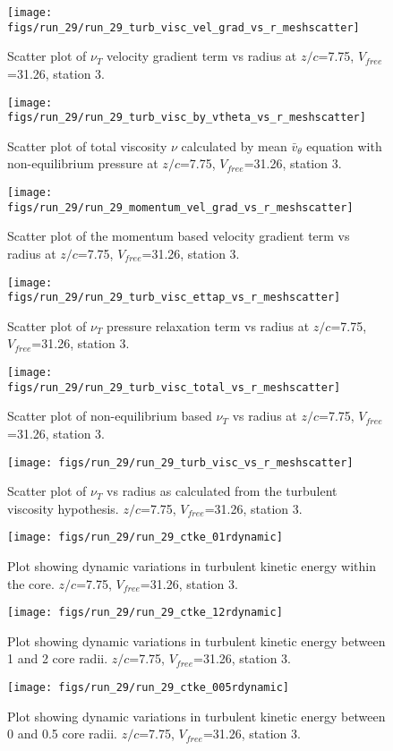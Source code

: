 \begin{figure}[H]
\centering
\texttt{[image: figs/run\_29/run\_29\_turb\_visc\_vel\_grad\_vs\_r\_meshscatter]}
\caption{Scatter plot of $\nu_T$ velocity gradient term vs radius at $z/c$=7.75, $V_{free}$=31.26, station 3.}
\end{figure}


\begin{figure}[H]
\centering
\texttt{[image: figs/run\_29/run\_29\_turb\_visc\_by\_vtheta\_vs\_r\_meshscatter]}
\caption{Scatter plot of total viscosity $\nu$ calculated by mean $\bar{v}_{\theta}$ equation with non-equilibrium pressure at $z/c$=7.75, $V_{free}$=31.26, station 3.}
\end{figure}


\begin{figure}[H]
\centering
\texttt{[image: figs/run\_29/run\_29\_momentum\_vel\_grad\_vs\_r\_meshscatter]}
\caption{Scatter plot of the momentum based velocity gradient term vs radius at $z/c$=7.75, $V_{free}$=31.26, station 3.}
\end{figure}


\begin{figure}[H]
\centering
\texttt{[image: figs/run\_29/run\_29\_turb\_visc\_ettap\_vs\_r\_meshscatter]}
\caption{Scatter plot of $\nu_T$ pressure relaxation term vs radius at $z/c$=7.75, $V_{free}$=31.26, station 3.}
\end{figure}


\begin{figure}[H]
\centering
\texttt{[image: figs/run\_29/run\_29\_turb\_visc\_total\_vs\_r\_meshscatter]}
\caption{Scatter plot of non-equilibrium based $\nu_T$ vs radius at $z/c$=7.75, $V_{free}$=31.26, station 3.}
\end{figure}


\begin{figure}[H]
\centering
\texttt{[image: figs/run\_29/run\_29\_turb\_visc\_vs\_r\_meshscatter]}
\caption{Scatter plot of $\nu_T$ vs radius as calculated from the turbulent viscosity hypothesis. $z/c$=7.75, $V_{free}$=31.26, station 3.}
\end{figure}


\begin{figure}[H]
\centering
\texttt{[image: figs/run\_29/run\_29\_ctke\_01rdynamic]}
\caption{Plot showing dynamic variations in turbulent kinetic energy within the core. $z/c$=7.75, $V_{free}$=31.26, station 3.}
\end{figure}


\begin{figure}[H]
\centering
\texttt{[image: figs/run\_29/run\_29\_ctke\_12rdynamic]}
\caption{Plot showing dynamic variations in turbulent kinetic energy between 1 and 2 core radii. $z/c$=7.75, $V_{free}$=31.26, station 3.}
\end{figure}


\begin{figure}[H]
\centering
\texttt{[image: figs/run\_29/run\_29\_ctke\_005rdynamic]}
\caption{Plot showing dynamic variations in turbulent kinetic energy between 0 and 0.5 core radii. $z/c$=7.75, $V_{free}$=31.26, station 3.}
\end{figure}



